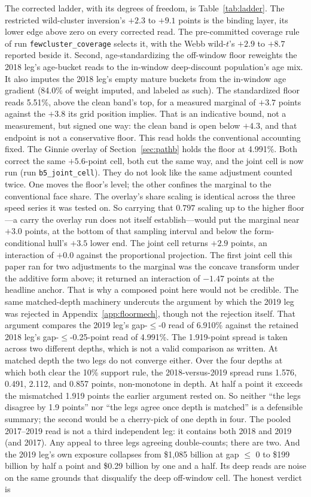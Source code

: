 \documentclass[12pt]{article}
\begin{document}
The corrected ladder, with its degrees of freedom, is Table~\ref{tab:ladder}. The restricted wild-cluster inversion's $+2.3$ to $+9.1$ points is the binding layer, its lower edge above zero on every corrected read. The pre-committed coverage rule of run \texttt{fewcluster\_coverage} selects it, with the Webb wild-$t$'s $+2.9$ to $+8.7$ reported beside it. Second, age-standardizing the off-window floor reweights the 2018 leg's age-bucket reads to the in-window deep-discount population's age mix. It also imputes the 2018 leg's empty mature buckets from the in-window age gradient (84.0\% of weight imputed, and labeled as such). The standardized floor reads 5.51\%, above the clean band's top, for a measured marginal of $+3.7$ points against the $+3.8$ its grid position implies. That is an indicative bound, not a measurement, but signed one way: the clean band is open below $+4.3$, and that endpoint is not a conservative floor. This read holds the conventional accounting fixed. The Ginnie overlay of Section~\ref{sec:pathb} holds the floor at 4.991\%. Both correct the same $+5.6$-point cell, both cut the same way, and the joint cell is now run (run \texttt{b5\_joint\_cell}). They do not look like the same adjustment counted twice. One moves the floor's level; the other confines the marginal to the conventional face share. The overlay's share scaling is identical across the three speed series it was tested on. So carrying that $0.797$ scaling up to the higher floor---a carry the overlay run does not itself establish---would put the marginal near $+3.0$ points, at the bottom of that sampling interval and below the form-conditional hull's $+3.5$ lower end. The joint cell returns $+2.9$ points, an interaction of $+0.0$ against the proportional projection. The first joint cell this paper ran for two adjustments to the marginal was the concave transform under the additive form above; it returned an interaction of $-1.47$ points at the headline anchor. That is why a composed point here would not be credible. The same matched-depth machinery undercuts the argument by which the 2019 leg was rejected in Appendix~\ref{app:floormech}, though not the rejection itself. That argument compares the 2019 leg's gap-$\leq$-0 read of 6.910\% against the retained 2018 leg's gap-$\leq$-0.25-point read of 4.991\%. The 1.919-point spread is taken across two different depths, which is not a valid comparison as written. At matched depth the two legs do not converge either. Over the four depths at which both clear the 10\% support rule, the 2018-versus-2019 spread runs 1.576, 0.491, 2.112, and 0.857 points, non-monotone in depth. At half a point it exceeds the mismatched 1.919 points the earlier argument rested on. So neither ``the legs disagree by 1.9 points'' nor ``the legs agree once depth is matched'' is a defensible summary; the second would be a cherry-pick of one depth in four. The pooled 2017--2019 read is not a third independent leg: it contains both 2018 and 2019 (and 2017). Any appeal to three legs agreeing double-counts; there are two. And the 2019 leg's own exposure collapses from \$1{,}085 billion at gap $\leq$ 0 to \$199 billion by half a point and \$0.29 billion by one and a half. Its deep reads are noise on the same grounds that disqualify the deep off-window cell. The honest verdict is 
\end{document}
